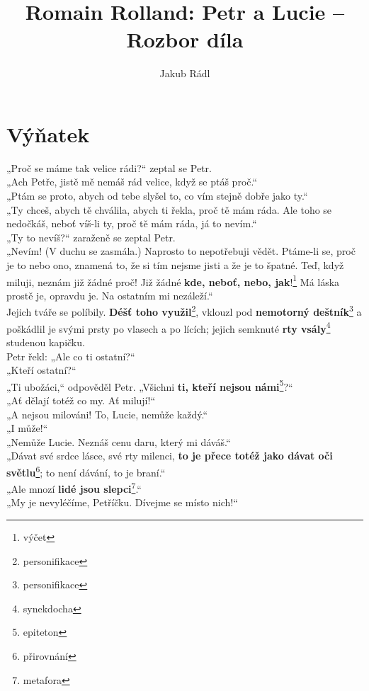 \documentclass[10pt,a4paper]{article}
\date{}
\author{Jakub Rádl}
\title{Romain Rolland: Petr a Lucie -- Rozbor díla}
\begin{document}
\maketitle

\section*{Výňatek}
„Proč se máme tak velice rádi?“ zeptal se Petr.\\
„Ach Petře, jistě mě nemáš rád velice, když se ptáš proč.“\\
„Ptám se proto, abych od tebe slyšel to, co vím stejně dobře jako ty.“\\
„Ty chceš, abych tě chválila, abych ti řekla, proč tě mám ráda. Ale toho se nedočkáš, neboť víš-li ty, proč tě mám ráda, já to nevím.“\\
„Ty to nevíš?“ zaraženě se zeptal Petr.\\
„Nevím! (V duchu se zasmála.) Naprosto to nepotřebuji vědět. Ptáme-li se, proč je to nebo ono, znamená to, že si tím nejsme jisti a že je to špatné. Teď, když miluji, neznám již žádné proč! Již žádné \textbf{kde, neboť, nebo, jak}!\footnote{výčet} Má láska prostě je, opravdu je. Na ostatním mi nezáleží.“\\
Jejich tváře se políbily. \textbf{Déšť toho využil}\footnote{personifikace}, vklouzl pod \textbf{nemotorný deštník}\footnote{personifikace} a poškádlil je svými prsty po vlasech a po lících; jejich semknuté \textbf{rty vsály}\footnote{synekdocha} studenou kapičku.\\
Petr řekl: „Ale co ti ostatní?“\\
„Kteří ostatní?“\\
„Ti ubožáci,“ odpověděl Petr. „Všichni \textbf{ti, kteří nejsou námi}\footnote{epiteton}?“\\
„Ať dělají totéž co my. Ať milují!“\\
„A nejsou milováni! To, Lucie, nemůže každý.“\\
„I může!“\\
„Nemůže Lucie. Neznáš cenu daru, který mi dáváš.“\\
„Dávat své srdce lásce, své rty milenci, \textbf{to je přece totéž jako dávat oči světlu}\footnote{přirovnání}; to není dávání, to je braní.“\\
„Ale mnozí \textbf{lidé jsou slepci}\footnote{metafora}.“\\
„My je nevyléčíme, Petříčku. Dívejme se místo nich!“\\
\end{document}
